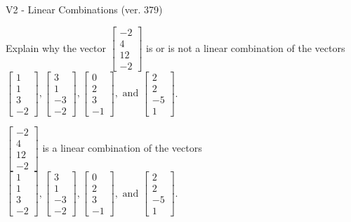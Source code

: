 \begin{exercise}
  \begin{exerciseTitle}V2 - Linear Combinations (ver. 379)\end{exerciseTitle}
  \begin{exerciseStatement}
    Explain why the vector \(\left[\begin{array}{c}
-2 \\
4 \\
12 \\
-2
\end{array}\right]\)  is or is not a linear 
	combination of the vectors \(\left[\begin{array}{c}
1 \\
1 \\
3 \\
-2
\end{array}\right] , \left[\begin{array}{c}
3 \\
1 \\
-3 \\
-2
\end{array}\right] , \left[\begin{array}{c}
0 \\
2 \\
3 \\
-1
\end{array}\right] , \text{ and } \left[\begin{array}{c}
2 \\
2 \\
-5 \\
1
\end{array}\right]\).
	


  \end{exerciseStatement}
  \begin{exerciseAnswer}
   \(\left[\begin{array}{c}
-2 \\
4 \\
12 \\
-2
\end{array}\right]\) 
  	 is  
	a linear combination of the vectors \(\left[\begin{array}{c}
1 \\
1 \\
3 \\
-2
\end{array}\right] , \left[\begin{array}{c}
3 \\
1 \\
-3 \\
-2
\end{array}\right] , \left[\begin{array}{c}
0 \\
2 \\
3 \\
-1
\end{array}\right] , \text{ and } \left[\begin{array}{c}
2 \\
2 \\
-5 \\
1
\end{array}\right]\).


\end{exerciseAnswer}
\end{exercise}
